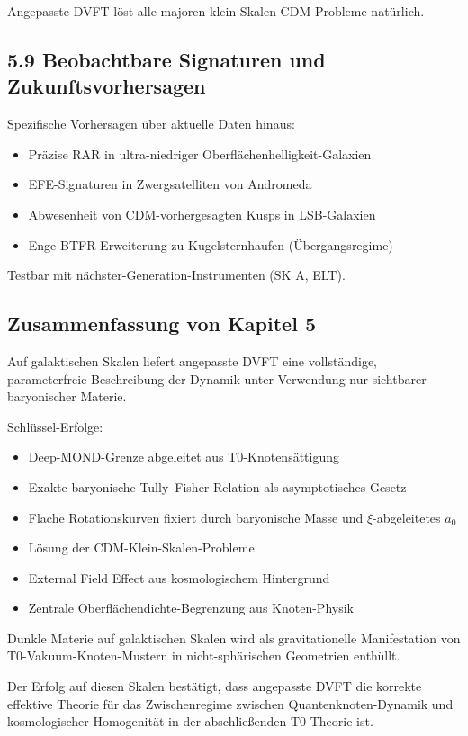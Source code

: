 	Angepasste DVFT löst alle majoren klein-Skalen-CDM-Probleme natürlich.
	
	\subsection{5.9 Beobachtbare Signaturen und Zukunftsvorhersagen}
	
	Spezifische Vorhersagen über aktuelle Daten hinaus:
	\begin{itemize}
		\item Präzise RAR in ultra-niedriger Oberflächenhelligkeit-Galaxien
		\item EFE-Signaturen in Zwergsatelliten von Andromeda
		\item Abwesenheit von CDM-vorhergesagten Kusps in LSB-Galaxien
		\item Enge BTFR-Erweiterung zu Kugelsternhaufen (Übergangsregime)
	\end{itemize}
	
	Testbar mit nächster-Generation-Instrumenten (SK A, ELT).
	
	\subsection{Zusammenfassung von Kapitel 5}
	
	Auf galaktischen Skalen liefert angepasste DVFT eine vollständige, parameterfreie Beschreibung der Dynamik unter Verwendung nur sichtbarer baryonischer Materie.
	
	Schlüssel-Erfolge:
	\begin{itemize}
		\item Deep-MOND-Grenze abgeleitet aus T0-Knotensättigung
		\item Exakte baryonische Tully–Fisher-Relation als asymptotisches Gesetz
		\item Flache Rotationskurven fixiert durch baryonische Masse und $\xi$-abgeleitetes $a_0$
		\item Lösung der CDM-Klein-Skalen-Probleme
		\item External Field Effect aus kosmologischem Hintergrund
		\item Zentrale Oberflächendichte-Begrenzung aus Knoten-Physik
	\end{itemize}
	
	Dunkle Materie auf galaktischen Skalen wird als gravitationelle Manifestation von T0-Vakuum-Knoten-Mustern in nicht-sphärischen Geometrien enthüllt.
	
	Der Erfolg auf diesen Skalen bestätigt, dass angepasste DVFT die korrekte effektive Theorie für das Zwischenregime zwischen Quantenknoten-Dynamik und kosmologischer Homogenität in der abschließenden T0-Theorie ist.
	
